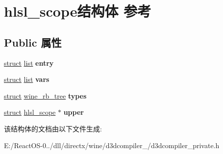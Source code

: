 \hypertarget{structhlsl__scope}{}\section{hlsl\+\_\+scope结构体 参考}
\label{structhlsl__scope}
\subsection*{Public 属性}
\begin{DoxyCompactItemize}
\item 
\mbox{\label{structhlsl__scope_abd8cc1951c00cb4990321d1d9a98ce64}} 
\hyperlink{interfacestruct}{struct} \hyperlink{classlist}{list} {\bfseries entry}
\item 
\mbox{\label{structhlsl__scope_ac6afefcccc16495ea200e499ebcba400}} 
\hyperlink{interfacestruct}{struct} \hyperlink{classlist}{list} {\bfseries vars}
\item 
\mbox{\label{structhlsl__scope_a8358871c4e4c77597b62647daebb97d6}} 
\hyperlink{interfacestruct}{struct} \hyperlink{structwine__rb__tree}{wine\+\_\+rb\+\_\+tree} {\bfseries types}
\item 
\mbox{\label{structhlsl__scope_af3e22df3583e993202a14e7dc070d4c5}} 
\hyperlink{interfacestruct}{struct} \hyperlink{structhlsl__scope}{hlsl\+\_\+scope} $\ast$ {\bfseries upper}
\end{DoxyCompactItemize}


该结构体的文档由以下文件生成\+:\begin{DoxyCompactItemize}
\item 
E\+:/\+React\+O\+S-\/0../dll/directx/wine/d3dcompiler\+\_/d3dcompiler\+\_\+private.\+h\end{DoxyCompactItemize}
